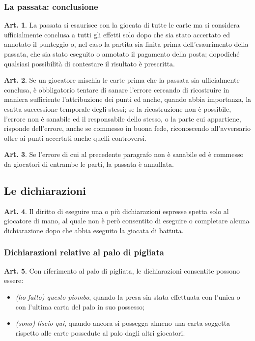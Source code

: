 \documentclass[italian,a4paper]{book}
\theoremstyle{definition}
\newtheorem{art}{Art.}
\newenvironment{packeditem}{
\begin{itemize}
  \setlength{\itemsep}{1pt}
  \setlength{\parskip}{0pt}
  \setlength{\parsep}{0pt}
}{\end{itemize}}
\begin{document}
\subsubsection{La passata: conclusione}
\begin{art}
    La passata si esaurisce con la giocata di tutte le carte ma si considera ufficialmente conclusa a tutti gli effetti solo dopo che sia stato accertato ed annotato il punteggio o, nel caso la partita sia finita prima dell'esaurimento della passata, che sia stato eseguito o annotato il pagamento della posta; dopodiché qualsiasi possibilità di contestare il risultato è prescritta.
\end{art}
\begin{art}
    Se un giocatore mischia le carte prima che la passata sia ufficialmente conclusa, è obbligatorio tentare di sanare l'errore cercando di ricostruire in maniera sufficiente l'attribuzione dei punti ed anche, quando abbia importanza, la esatta successione temporale degli stessi; se la ricostruzione non è possibile, l'errore non è sanabile ed il responsabile dello stesso, o la parte cui appartiene, risponde dell'errore, anche se commesso in buona fede, riconoscendo all'avversario oltre ai punti accertati anche quelli controversi.
\end{art}
\begin{art}\label{err.pass}
    Se l'errore di cui al precedente paragrafo non è sanabile ed è commesso da giocatori di entrambe le parti, la passata è annullata.
\end{art}
\subsection{Le dichiarazioni}
\begin{art}\label{diritto.dich}
    Il diritto di eseguire una o più dichiarazioni espresse spetta solo al giocatore di mano, al quale non è però consentito di eseguire o completare alcuna dichiarazione dopo che abbia eseguito la giocata di battuta.
\end{art}
\subsubsection{Dichiarazioni relative al palo di pigliata}
\begin{art}
    Con riferimento al palo di pigliata, le dichiarazioni consentite possono essere:
    \begin{packeditem}
\item      \emph{(ho fatto) questo piombo}, quando la presa sia stata effettuata con l'unica o con l'ultima carta del palo in suo possesso; 
\item      \emph{(sono) liscio qui}, quando ancora si possegga almeno una carta soggetta rispetto alle carte possedute al palo dagli altri giocatori.
    \end{packeditem}
\end{art}
\end{document}
